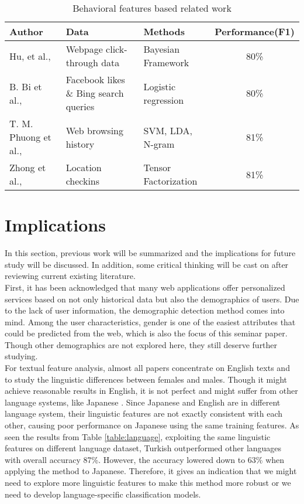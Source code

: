\documentclass[runningheads]{llncs}
\begin{document}
	\begin{table}
		\caption{Behavioral features based related work }
		\centering
		\begin{tabular}{| l | l | l | c | }
			\hline
			Author  &  Data  & Methods & Performance(F1)\\
			\hline
			Hu, et al.,  \cite{hu2007demographic} & Webpage click-through data
			& Bayesian Framework
			& 80\% \\
			B. Bi et al., \cite{bi2013inferring} & Facebook likes \& Bing search queries & Logistic regression & 80\% \\
			T. M. Phuong et al., \cite{phuong2014gender} & Web browsing history & SVM, LDA, N-gram
			& 81\% \\
			Zhong et al., \cite{zhong2015you} & Location checkins & Tensor Factorization & 81\% \\
			\hline
		\end{tabular}
		\label{table:behavioral_work}
	\end{table}
	
	\section{Implications}
	
	In this section, previous work will be summarized and the implications for future study will be discussed. In addition, some critical thinking will be cast on after reviewing current existing literature. \\
	
	First, it has been acknowledged that many web applications offer personalized services based on not only historical data but also the demographics of users. Due to the lack of user information, the demographic detection method comes into mind. Among the user characteristics, gender is one of the easiest attributes that could be predicted from the web, which is also the focus of this seminar paper. Though other demographics are not explored here, they still deserve further studying. \\
	
	For textual feature analysis, almost all papers concentrate on English texts and to study the linguistic differences between females and males. Though it might achieve reasonable results in English, it is not perfect and might suffer from other language systems, like Japanese \cite{ciot2013gender}. Since Japanese and English are in different language system, their linguistic features are not exactly consistent with each other, causing poor performance on Japanese using the same training features. As seen the results from Table \ref{table:language}, exploiting the same linguistic features on different language dataset, Turkish outperformed other languages with overall accuracy 87\%. However, the accuracy lowered down to 63\% when applying the method to Japanese. Therefore, it gives an indication that we might need to explore more linguistic features to make this method more robust or we need to develop language-specific classification models. \\
	
\end{document}
